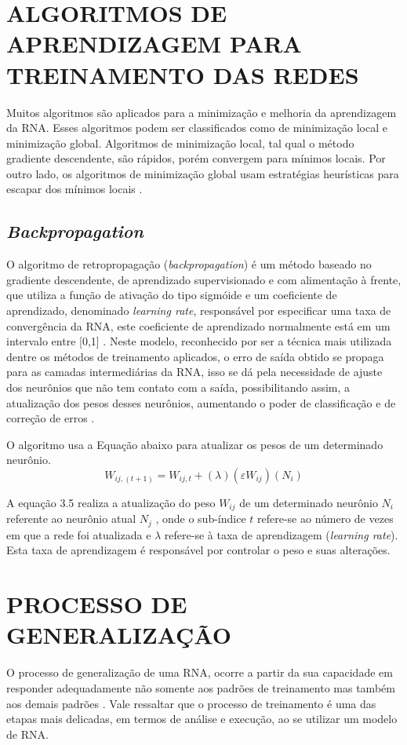 \section{ALGORITMOS DE APRENDIZAGEM PARA TREINAMENTO DAS REDES}\label{algoritmos-aprendizagem}
Muitos algoritmos são aplicados para a minimização e melhoria da aprendizagem da RNA. Esses algoritmos podem ser classificados como de minimização local e minimização global. Algoritmos de minimização local, tal qual o método gradiente descendente, são rápidos, porém convergem para mínimos locais. Por outro lado, os algoritmos de minimização global usam estratégias heurísticas para escapar dos mínimos locais \cite{haykin2000}.

\subsection{\textit{Backpropagation}}
O algoritmo de retropropagação (\textit{backpropagation}) é um método baseado no gradiente descendente, de aprendizado supervisionado e com alimentação à frente, que utiliza a função de ativação do tipo sigmóide e um coeficiente de aprendizado, denominado \textit{learning rate}, responsável por especificar uma taxa de convergência da RNA, este coeficiente de aprendizado normalmente está em um intervalo entre [0,1]    \cite{haykin2000}.
Neste modelo, reconhecido por ser a técnica mais utilizada dentre os métodos de treinamento aplicados, o erro de saída obtido se propaga para as camadas intermediárias da RNA, isso se dá pela necessidade de ajuste dos neurônios que não tem contato com a saída, possibilitando assim, a atualização dos pesos desses neurônios, aumentando o poder de classificação e de correção de erros \cite{medeiros}.

O algoritmo usa a Equação abaixo para atualizar os pesos de um determinado neurônio.
\begin{equation}\label{eq:backpropagation-ajuste-pesos}
W_{ij,(t+1)} = W_{ij, t} + (\lambda)(\varepsilon W_{ij})(N_i)
\end{equation}

A equação 3.5 realiza a atualização do peso $W_{ij}$ de um determinado neurônio $N_i$ referente ao neurônio atual $N_j$ , onde o sub-índice $t$ refere-se ao número de vezes em que a rede foi atualizada e $\lambda$ refere-se à taxa de aprendizagem (\textit{learning rate}). Esta taxa de aprendizagem é responsável por controlar o peso e suas alterações.	

\section{PROCESSO DE GENERALIZAÇÃO}\label{rna-generalização}
O processo de generalização de uma RNA, ocorre a partir da sua capacidade em responder adequadamente não somente aos padrões de treinamento mas também aos demais padrões \cite{medeiros}. Vale ressaltar que o processo de treinamento é uma das etapas mais delicadas, em termos de análise e execução, ao se utilizar um modelo de RNA.

